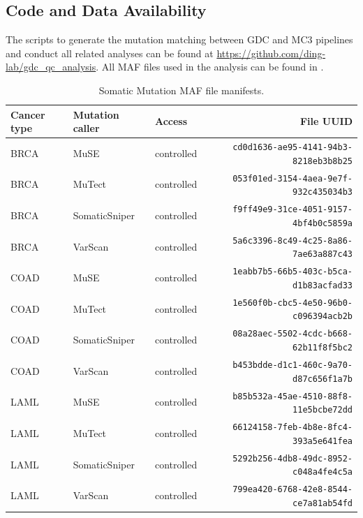 \subsection{Code and Data Availability}
The scripts to generate the mutation matching between GDC and MC3 pipelines and conduct all related analyses can be found at \url{https://github.com/ding-lab/gdc_qc_analysis}. All MAF files used in the analysis can be found in .

\begin{table}[tbp]
    \centering
    \caption{Somatic Mutation MAF file manifests.}
    \label{tab:mut-call-qc-data-src}

    \footnotesize
    \begin{subtable}{1\linewidth}
        \centering
        \label{tab:mut-call-qc-data-src-gdc}
        \begin{tabular}{lllr}
            \toprule
            Cancer type & Mutation caller & Access & File UUID \\
            \midrule
            BRCA & MuSE & controlled & \texttt{cd0d1636-ae95-4141-94b3-8218eb3b8b25} \\
            BRCA & MuTect & controlled & \texttt{053f01ed-3154-4aea-9e7f-932c435034b3} \\
            BRCA & SomaticSniper & controlled & \texttt{f9ff49e9-31ce-4051-9157-4bf4b0c5859a} \\
            BRCA & VarScan & controlled & \texttt{5a6c3396-8c49-4c25-8a86-7ae63a887c43} \\
            COAD & MuSE & controlled & \texttt{1eabb7b5-66b5-403c-b5ca-d1b83acfad33} \\
            COAD & MuTect & controlled & \texttt{1e560f0b-cbc5-4e50-96b0-c096394acb2b} \\
            COAD & SomaticSniper & controlled & \texttt{08a28aec-5502-4cdc-b668-62b11f8f5bc2} \\
            COAD & VarScan & controlled & \texttt{b453bdde-d1c1-460c-9a70-d87c656f1a7b} \\
            LAML & MuSE & controlled & \texttt{b85b532a-45ae-4510-88f8-11e5bcbe72dd} \\
            LAML & MuTect & controlled & \texttt{66124158-7feb-4b8e-8fc4-393a5e641fea} \\
            LAML & SomaticSniper & controlled & \texttt{5292b256-4db8-49dc-8952-c048a4fe4c5a} \\
            LAML & VarScan & controlled & \texttt{799ea420-6768-42e8-8544-ce7a81ab54fd} \\

\end{tabular}
\end{subtable}
\end{table}
